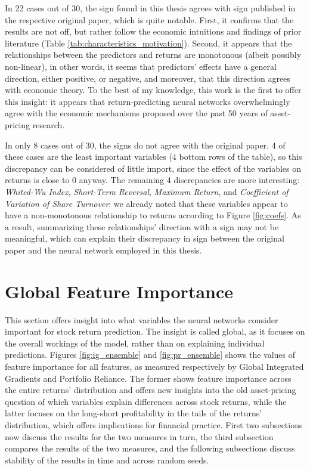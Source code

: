 	In 22 cases out of 30, the sign found in this thesis agrees with sign published in the respective original paper, which is quite notable. First, it confirms that the results are not off, but rather follow the economic intuitions and findings of prior literature (Table \ref{tab:characteristics_motivation}). Second, it appears that the relationships between the predictors and returns are monotonous (albeit possibly non-linear), in other words, it seems that predictors' effects have a general direction, either positive, or negative, and moreover, that this direction agrees with economic theory. To the best of my knowledge, this work is the first to offer this insight: it appears that return-predicting neural networks overwhelmingly agree with the economic mechanisms proposed over the past 50 years of asset-pricing research.
	
	In only 8 cases out of 30, the signs do not agree with the original paper. 4 of these cases are the least important variables (4 bottom rows of the table), so this discrepancy can be considered of little import, since the effect of the variables on returns is close to 0 anyway. The remaining 4 discrepancies are more interesting: \textit{Whited-Wu Index}, \textit{Short-Term Reversal}, \textit{Maximum Return}, and \textit{Coefficient of Variation of Share Turnover}: we already noted that these variables appear to have a non-monotonous relationship to returns according to Figure \ref{fig:coefs}. As a result, summarizing these relationships' direction with a sign may not be meaningful, which can explain their discrepancy in sign between the original paper and the neural network employed in this thesis. 
	
	
\section{Global Feature Importance}
	\label{chap:global_feature_importance}
	
	This section offers insight into what variables the neural networks consider important for stock return prediction. The insight is called global, as it focuses on the overall workings of the model, rather than on explaining individual predictions. Figures \ref{fig:ig_ensemble} and \ref{fig:pr_ensemble} shows the values of feature importance for all features, as measured respectively by Global Integrated Gradients and Portfolio Reliance. The former shows feature importance across the entire returns' distribution and offers new insights into the old asset-pricing question of which variables explain differences across stock returns, while the latter focuses on the long-short profitability in the tails of the returns' distribution, which offers implications for financial practice. First two subsections now discuss the results for the two measures in turn, the third subsection compares the results of the two measures, and the following subsections discuss stability of the results in time and across random seeds. 
	
